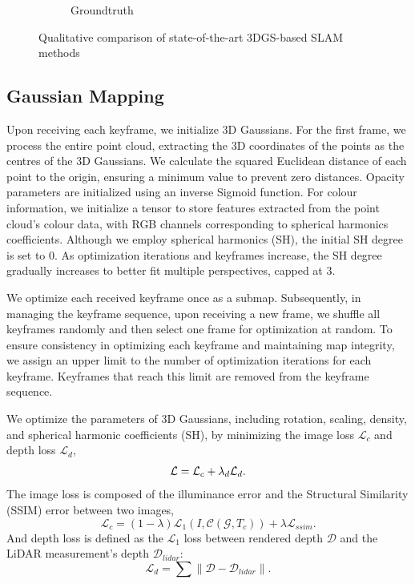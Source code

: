 \documentclass[lettersize,journal]{IEEEtran}
\begin{document}
\begin{figure}[ht]
\begin{subfigure}{0.23\textwidth}
        \caption{Groundtruth}
        \label{fig:qualitativecomparisongroundtruth}
    \end{subfigure}
    \caption{Qualitative comparison of state-of-the-art 3DGS-based SLAM methods
    \label{fig:qualitativecomparison}}
\end{figure}


\subsection{Gaussian Mapping}
Upon receiving each keyframe, we initialize 3D Gaussians. For the first frame, we process the entire point cloud, extracting the 3D coordinates of the points as the centres of the 3D Gaussians. We calculate the squared Euclidean distance of each point to the origin, ensuring a minimum value to prevent zero distances. Opacity parameters are initialized using an inverse Sigmoid function. For colour information, we initialize a tensor to store features extracted from the point cloud's colour data, with RGB channels corresponding to spherical harmonics coefficients. Although we employ spherical harmonics (SH), the initial SH degree is set to 0. As optimization iterations and keyframes increase, the SH degree gradually increases to better fit multiple perspectives, capped at 3.

We optimize each received keyframe once as a submap. Subsequently, in managing the keyframe sequence, upon receiving a new frame, we shuffle all keyframes randomly and then select one frame for optimization at random. To ensure consistency in optimizing each keyframe and maintaining map integrity, we assign an upper limit to the number of optimization iterations for each keyframe. Keyframes that reach this limit are removed from the keyframe sequence.

We optimize the parameters of 3D Gaussians, including rotation, scaling, density, and spherical harmonic coefficients (SH), by minimizing the image loss $\mathcal{L}_c$ and depth loss $\mathcal{L}_d$,
\begin{equation}
\mathcal{L}={\mathcal{L}_c} + {{\lambda}_d}{\mathcal{L}_d}.
\label{eq:mathcal{L}}
\end{equation}
The image loss is composed of the illuminance error and the Structural Similarity (SSIM) error between two images,
\begin{equation}
\mathcal{L}_c=(1-\lambda){\mathcal{L}_1}(I,\mathcal{C}(\mathcal{G},{T_c})) + \lambda{\mathcal{L}_{ssim}}.
\label{eq:mathcalLc}
\end{equation}
And depth loss is defined as the $\mathcal{L}_1$ loss between rendered depth $\mathcal{D}$ and the LiDAR measurement’s depth $\mathcal{D}_{lidar}$:
\begin{equation}
\mathcal{L}_d = \sum \left\lVert \mathcal{D} - \mathcal{D}_{lidar} \right\rVert .
\label{eq:mathcalLd}
\end{equation}
\end{document}
